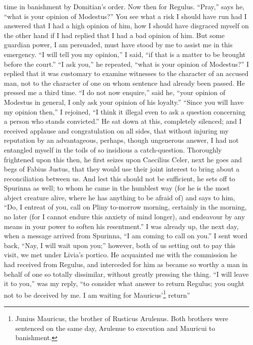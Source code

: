 time in banishment by Domitian's order. Now then for Regulus. ``Pray,'' says
he, ``what is your opinion of Modestus?'' You see what a risk I should have
run had I answered that I had a high opinion of him, how I should have
disgraced myself on the other hand if I had replied that I had a bad
opinion of him. But some guardian power, I am persuaded, must have stood
by me to assist me in this emergency. ``I will tell you my opinion,'' I
said, ``if that is a matter to be brought before the court.'' ``I ask you,''
he repeated, ``what is your opinion of Modestus?'' I replied that it was
customary to examine witnesses to the character of an accused man, not to
the character of one on whom sentence had already been passed. He pressed
me a third time. ``I do not now enquire,'' said he, ``your opinion of
Modestus in general, I only ask your opinion of his loyalty.'' ``Since you
will have my opinion then,'' I rejoined, ``I think it illegal even to ask a
question concerning a person who stands convicted.'' He sat down at this,
completely silenced; and I received applause and congratulation on all
sides, that without injuring my reputation by an advantageous, perhaps,
though ungenerous answer, I had not entangled myself in the toils of so
insidious a catch-question. Thoroughly frightened upon this then, he first
seizes upon Caecilius Celer, next he goes and begs of Fabius Justus, that
they would use their joint interest to bring about a reconciliation
between us. And lest this should not be sufficient, he sets off to
Spurinna as well; to whom he came in the humblest way (for he is the most
abject creature alive, where he has anything to be afraid of) and says to
him, ``Do, I entreat of you, call on Pliny to-morrow morning, certainly in
the morning, no later (for I cannot endure this anxiety of mind longer),
and endeavour by any means in your power to soften his resentment.'' I was
already up, the next day, when a message arrived from Spurinna, ``I am
coming to call on you.'' I sent word back, ``Nay, I will wait upon you;''
however, both of us setting out to pay this visit, we met under Livia's
portico. He acquainted me with the commission he had received from
Regulus, and interceded for him as became so worthy a man in behalf of one
so totally dissimilar, without greatly pressing the thing. ``I will leave
it to you,'' was my reply, ``to consider what answer to return Regulus; you
ought not to be deceived by me. I am waiting for Mauricus'\footnote{Junius Mauricus, the
brother of Rusticus Arulenus. Both brothers were sentenced on the same
day, Arulenue to execution and Mauricui to banishment.} return''

